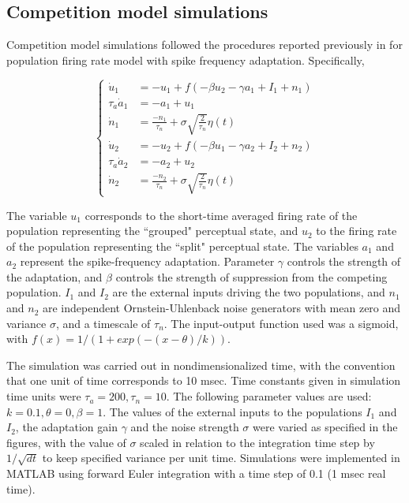 \documentclass{frontiersSCNS} %
\begin{document}
\subsection*{Competition model simulations}
Competition model simulations followed the procedures reported previously in \cite{Shpiro2009} for population firing rate model with spike frequency adaptation. Specifically,

\begin{equation*}
	\begin{cases}
	\dot{u}_1 & = -u_1 +  f(-\beta u_2 - \gamma a_1 + I_1 + n_1) \\
	\tau_a \dot{a}_1 & = -a_1 + u_1\\
	\dot{n}_1 & = \frac{-n_1}{\tau_n} + \sigma \sqrt{\frac{2}{\tau_n}} \eta(t)\\
	\dot{u}_2 & = -u_2 +  f(-\beta u_1 - \gamma a_2 + I_2 + n_2) \\
	\tau_a \dot{a}_2 & = -a_2 + u_2\\
	\dot{n}_2 & = \frac{-n_2}{\tau_n } + \sigma \sqrt{\frac{2}{\tau_n}} \eta(t)
	
	\end{cases}
\end{equation*}

The variable $u_1$ corresponds to the short-time averaged firing rate of the population representing the ``grouped" perceptual state, and $u_2$ to the firing rate of the population representing the ``split" perceptual state. The variables $a_1$ and $a_2$ represent the spike-frequency adaptation. Parameter $\gamma$ controls the strength of the adaptation, and $\beta$ controls the strength of suppression from the competing population. $I_1$ and $I_2$ are the external inputs driving the two populations, and $n_1$ and $n_2$ are independent Ornstein-Uhlenback noise generators with mean zero and variance $\sigma$, and a timescale of $\tau_n$. 
The input-output function used was a sigmoid, with $f (x) = 1/(1 + exp(-(x - \theta )/ k))$. 

The simulation was carried out in nondimensionalized time, with the convention that one unit of time corresponds to 10 msec. Time constants given in simulation time units were $\tau_a = 200, \tau_n = 10$. The following parameter values are used: $k = 0.1, \theta = 0, \beta = 1$.  The values of the external inputs to the populations $I_1$ and $I_2$, the adaptation gain $\gamma$ and the noise strength $\sigma$ were varied as specified in the figures, with the value of $\sigma$ scaled in relation to the integration time step by $1/\sqrt{dt}$ to keep specified variance per unit time. Simulations were implemented in MATLAB using forward Euler integration with a time step of 0.1 (1 msec real time).
\end{document}
